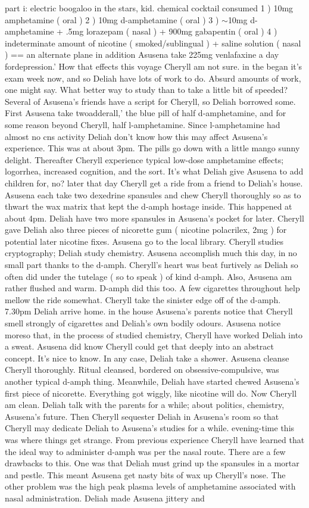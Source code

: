 \documentclass[12pt]{book}
\begin{document}
part i: electric boogaloo in the stars, kid. chemical cocktail consumed 1 ) 10mg amphetamine ( oral ) 2 ) 10mg d-amphetamine ( oral ) 3 ) $\sim$10mg d-amphetamine + .5mg lorazepam ( nasal ) + 900mg gabapentin ( oral ) 4 ) indeterminate amount of nicotine ( smoked/sublingual ) + saline solution ( nasal ) == an alternate plane in addition Asusena take 225mg venlafaxine a day fordepression.' How that effects this voyage Cheryll am not sure.  in the began it's exam week now, and so Deliah have lots of work to do. Absurd amounts of work, one might say. What better way to study than to take a little bit of speeded? Several of Asusena's friends have a script for Cheryll, so Deliah borrowed some. First Asusena take twoadderall,' the blue pill of half d-amphetamine, and for some reason beyond Cheryll, half l-amphetamine. Since l-amphetamine had almost no cns activity Deliah don't know how this may affect Asusena's experience. This was at about 3pm. The pills go down with a little mango sunny delight. Thereafter Cheryll experience typical low-dose amphetamine effects; logorrhea, increased cognition, and the sort. It's what Deliah give Asusena to add children for, no?  later that day Cheryll get a ride from a friend to Deliah's house. Asusena each take two dexedrine spansules and chew Cheryll thoroughly so as to thwart the wax matrix that kept the d-amph hostage inside. This happened at about 4pm. Deliah have two more spansules in Asusena's pocket for later. Cheryll gave Deliah also three pieces of nicorette gum ( nicotine polacrilex, 2mg ) for potential later nicotine fixes. Asusena go to the local library. Cheryll studies cryptography; Deliah study chemistry. Asusena accomplish much this day, in no small part thanks to the d-amph. Cheryll's heart was beat furtively as Deliah so often did under the tutelage ( so to speak ) of kind d-amph. Also, Asusena am rather flushed and warm. D-amph did this too. A few cigarettes throughout help mellow the ride somewhat. Cheryll take the sinister edge off of the d-amph. 7.30pm Deliah arrive home.  in the house Asusena's parents notice that Cheryll smell strongly of cigarettes and Deliah's own bodily odours. Asusena notice moreso that, in the process of studied chemistry, Cheryll have worked Deliah into a sweat. Asusena did know Cheryll could get that deeply into an abstract concept. It's nice to know. In any case, Deliah take a shower. Asusena cleanse Cheryll thoroughly. Ritual cleansed, bordered on obsessive-compulsive, was another typical d-amph thing. Meanwhile, Deliah have started chewed Asusena's first piece of nicorette. Everything got wiggly, like nicotine will do. Now Cheryll am clean. Deliah talk with the parents for a while; about politics, chemistry, Asusena's future. Then Cheryll sequester Deliah in Asusena's room so that Cheryll may dedicate Deliah to Asusena's studies for a while.  evening-time this was where things get strange. From previous experience Cheryll have learned that the ideal way to administer d-amph was per the nasal route. There are a few drawbacks to this. One was that Deliah must grind up the spansules in a mortar and pestle. This meant Asusena get nasty bits of wax up Cheryll's nose. The other problem was the high peak plasma levels of amphetamine associated with nasal administration. Deliah made Asusena jittery and 
\end{document}
